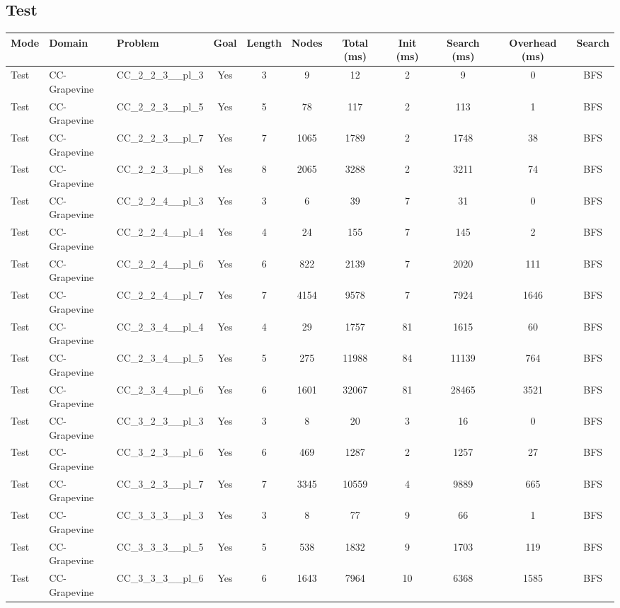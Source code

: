 \documentclass{article}
\begin{document}
\subsection*{Test}
\begin{tabular}{lllcccccccc}
\toprule
Mode & Domain & Problem & Goal & Length & Nodes & Total (ms) & Init (ms) & Search (ms) & Overhead (ms) & Search \\
\midrule
Test & CC-Grapevine & CC\_2\_2\_3\_\_pl\_3 & Yes & 3 & 9 & 12 & 2 & 9 & 0 & BFS \\
Test & CC-Grapevine & CC\_2\_2\_3\_\_pl\_5 & Yes & 5 & 78 & 117 & 2 & 113 & 1 & BFS \\
Test & CC-Grapevine & CC\_2\_2\_3\_\_pl\_7 & Yes & 7 & 1065 & 1789 & 2 & 1748 & 38 & BFS \\
Test & CC-Grapevine & CC\_2\_2\_3\_\_pl\_8 & Yes & 8 & 2065 & 3288 & 2 & 3211 & 74 & BFS \\
Test & CC-Grapevine & CC\_2\_2\_4\_\_pl\_3 & Yes & 3 & 6 & 39 & 7 & 31 & 0 & BFS \\
Test & CC-Grapevine & CC\_2\_2\_4\_\_pl\_4 & Yes & 4 & 24 & 155 & 7 & 145 & 2 & BFS \\
Test & CC-Grapevine & CC\_2\_2\_4\_\_pl\_6 & Yes & 6 & 822 & 2139 & 7 & 2020 & 111 & BFS \\
Test & CC-Grapevine & CC\_2\_2\_4\_\_pl\_7 & Yes & 7 & 4154 & 9578 & 7 & 7924 & 1646 & BFS \\
Test & CC-Grapevine & CC\_2\_3\_4\_\_pl\_4 & Yes & 4 & 29 & 1757 & 81 & 1615 & 60 & BFS \\
Test & CC-Grapevine & CC\_2\_3\_4\_\_pl\_5 & Yes & 5 & 275 & 11988 & 84 & 11139 & 764 & BFS \\
Test & CC-Grapevine & CC\_2\_3\_4\_\_pl\_6 & Yes & 6 & 1601 & 32067 & 81 & 28465 & 3521 & BFS \\
Test & CC-Grapevine & CC\_3\_2\_3\_\_pl\_3 & Yes & 3 & 8 & 20 & 3 & 16 & 0 & BFS \\
Test & CC-Grapevine & CC\_3\_2\_3\_\_pl\_6 & Yes & 6 & 469 & 1287 & 2 & 1257 & 27 & BFS \\
Test & CC-Grapevine & CC\_3\_2\_3\_\_pl\_7 & Yes & 7 & 3345 & 10559 & 4 & 9889 & 665 & BFS \\
Test & CC-Grapevine & CC\_3\_3\_3\_\_pl\_3 & Yes & 3 & 8 & 77 & 9 & 66 & 1 & BFS \\
Test & CC-Grapevine & CC\_3\_3\_3\_\_pl\_5 & Yes & 5 & 538 & 1832 & 9 & 1703 & 119 & BFS \\
Test & CC-Grapevine & CC\_3\_3\_3\_\_pl\_6 & Yes & 6 & 1643 & 7964 & 10 & 6368 & 1585 & BFS \\

\end{tabular}
\end{document}
